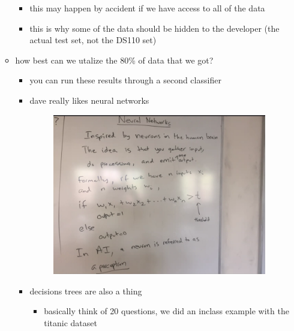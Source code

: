 \documentclass[12pt]{article}
\begin{document}
\begin{itemize}
\begin{itemize}
\begin{itemize}
				\item this may happen by accident if we have access to all of the data
				\item this is why some of the data should be hidden to the developer (the actual test set, not the DS110 set)
			\end{itemize}
			\item how best can we utalize the 80\% of data that we got? 
			\begin{itemize} %
				\item you can run these results through a second classifier 
				\item dave really likes neural networks 
				\begin{figure}[ht] 
					\centering
					\includegraphics[scale=0.5]{neuralnetworks.png} 
				\end{figure}
				\item decisions trees are also a thing 
				\begin{itemize} %
					\item basically think of 20 questions, we did an inclass example with the titanic dataset 
				\end{itemize}
			\end{itemize}      
		\end{itemize}
	\end{itemize}
	\vfill
	\clearpage
\end{document}
